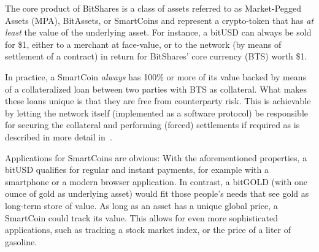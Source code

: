 The core product of BitShares is a class of assets referred to as Market-Pegged
Assets (MPA), BitAssets, or SmartCoins and represent a crypto-token that has
\emph{at least} the value of the underlying asset. For instance, a bitUSD can
always be sold for \$1, either to a merchant at face-value, or to the network
(by means of settlement of a contract) in return for BitShares' core currency
(BTS) worth \$1.

In practice, a SmartCoin \emph{always} has 100\% or more of its value backed by
means of a collateralized loan between two parties with BTS as
collateral. What makes these loans unique is that they are free from
counterparty risk. This is achievable by letting the network itself
(implemented as a software protocol) be responsible for securing the collateral
and performing (forced) settlements if required as is described in more detail
in~\cite{bts:financial}.

Applications for SmartCoins are obvious: With the aforementioned properties, a
bitUSD qualifies for regular and instant payments, for example with a
smartphone or a modern browser application. In contrast, a bitGOLD (with one
ounce of gold as underlying asset) would fit those people's needs that see gold
as long-term store of value. As long as an asset has a unique global price, a
SmartCoin could track its value. This allows for even more sophisticated
applications, such as tracking a stock market index, or the price of a liter of
gasoline.
